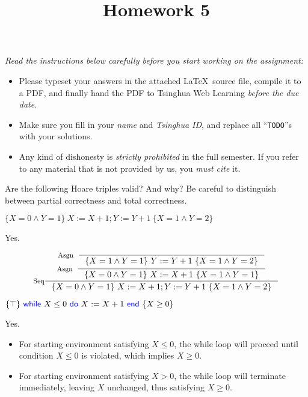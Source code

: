 \documentclass[11pt,a4paper]{article}
\title{Homework 5}
\newcommand{\kword}[1]{{\color{blue} \textsf{#1}}}
\newcommand{\While}{\kword{while}}
\newcommand{\Do}{\kword{do}}
\newcommand{\End}{\kword{end}}
\begin{document}
\maketitle

\textit{Read the instructions below carefully before you start working on the assignment:}
\begin{itemize}
    \item Please typeset your answers in the attached \LaTeX~source file, compile it to a PDF,
    and finally hand the PDF to Tsinghua Web Learning \emph{before the due date}.
    \item Make sure you fill in your \emph{name} and \emph{Tsinghua ID},
    and replace all ``\texttt{TODO}''s with your solutions.
    \item Any kind of dishonesty is \emph{strictly prohibited} in the full semester.
    If you refer to any material that is not provided by us, you \emph{must cite} it.
\end{itemize}


Are the following Hoare triples valid? And why?
Be careful to distinguish between partial correctness and total correctness.

\subproblem $\{X = 0 \land Y = 1\}~X := X + 1; Y := Y + 1~\{X = 1 \land Y = 2\}$

\begin{solution}
  Yes. 
  
  $$\inference[Seq]{\inference[Asgn]{}{\{X = 1 \land Y = 1\}~Y := Y + 1~\{X = 1 \land Y = 2\}} \\ \inference[Asgn]{}{\{X = 0 \land Y = 1\}~X := X + 1~\{X = 1 \land Y = 1\}}}{\{X = 0 \land Y = 1\}~X := X + 1; Y := Y + 1~\{X = 1 \land Y = 2\}}$$
\end{solution}

\subproblem $\{\top\}~\While~X \le 0~\Do~X := X + 1~\End~\{X \ge 0\}$

\begin{solution}
  Yes.
  
  \begin{itemize}
    \item For starting environment satisfying $X \le 0$, the while loop will proceed until condition $X \le 0$ is violated, which implies $X \ge 0$.
    \item For starting environment satisfying $X > 0$, the while loop will terminate immediately, leaving $X$ unchanged, thus satisfying $X \ge 0$.
  \end{itemize}
\end{solution}
\end{document}
